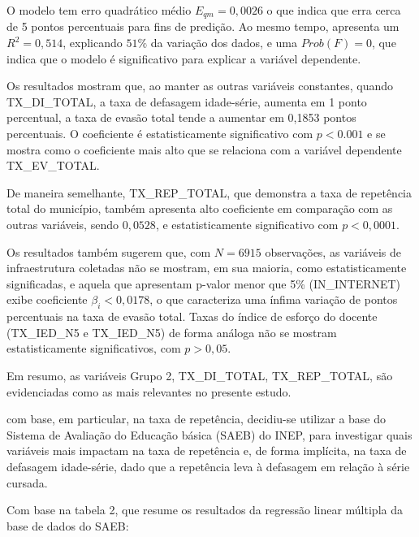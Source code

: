 \documentclass[english, spanish, brazilian]{RBIEarticle} %
\begin{document}
O modelo tem erro quadrático médio $E_{qm}=0,0026$ o que indica que erra cerca de 5 pontos percentuais para fins de predição. Ao mesmo tempo, apresenta um $R^2=0,514$, explicando $51\%$ da variação dos dados, e uma $Prob(F)=0$, que indica que o modelo é significativo para explicar a variável dependente.

Os resultados mostram que, ao manter as outras variáveis constantes, quando TX\_DI\_TOTAL, a taxa de defasagem idade-série, aumenta em 1 ponto percentual, a taxa de evasão total tende a aumentar em 0,1853 pontos percentuais. O coeficiente é estatisticamente significativo com $p<0.001$ e se mostra como o coeficiente mais alto que se relaciona com a variável dependente TX\_EV\_TOTAL.

De maneira semelhante, TX\_REP\_TOTAL, que demonstra a taxa de repetência total do município, também apresenta alto coeficiente em comparação com as outras variáveis, sendo $0,0528$, e estatisticamente significativo com $p<0,0001$.

Os resultados também sugerem que, com $N=6915$ observações, as variáveis de infraestrutura coletadas não se mostram, em sua maioria, como estatisticamente significadas, e aquela que apresentam p-valor menor que 5\% (IN\_INTERNET) exibe coeficiente $\beta_i<0,0178$, o que caracteriza uma ínfima variação de pontos percentuais na taxa de evasão total. Taxas do índice de esforço do docente (TX\_IED\_N5 e TX\_IED\_N5) de forma análoga não se mostram estatisticamente significativos, com $p>0,05$.

Em resumo, as variáveis Grupo 2, TX\_DI\_TOTAL, TX\_REP\_TOTAL, são evidenciadas como as mais relevantes no presente estudo. 

com base, em particular, na taxa de repetência, decidiu-se utilizar a base do Sistema de Avaliação do Educação básica (SAEB) do INEP, para investigar quais variáveis mais impactam na taxa de repetência e, de forma implícita, na taxa de defasagem idade-série, dado que a repetência leva à defasagem em relação à série cursada.

Com base na tabela 2, que resume os resultados da regressão linear múltipla da base de dados do SAEB:
\end{document}
